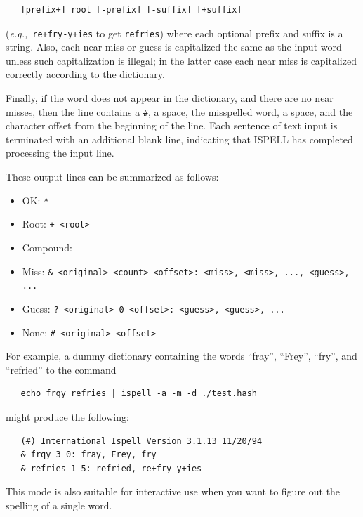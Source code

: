 \documentclass[twoside,11pt]{article}
\begin{document}
\begin{itemize}
\begin{verbatim}
   [prefix+] root [-prefix] [-suffix] [+suffix]
\end{verbatim}

({\it{e.g.,}}\ \verb=re+fry-y+ies= to get \verb+refries+) where each optional
prefix and suffix is a string.
Also, each near miss or guess is capitalized the same as the input word unless
such capitalization is illegal; in the latter case each near miss is
capitalized correctly according to the dictionary.

Finally, if the word does not appear in the dictionary, and there are no
near misses, then the line contains a \verb+#+, a space, the misspelled word, a
space, and the character offset from the beginning of the line.
Each sentence of text input is terminated with an additional blank line,
indicating that ISPELL has completed processing the input line.

These output lines can be summarized as follows:

\begin{itemize}
   \item OK:
       \verb+*+
   \item Root:
       \verb-+ <root>-
   \item Compound:
       \verb+-+
   \item Miss:
       \verb+& <original> <count> <offset>: <miss>, <miss>, ..., <guess>, ...+
   \item Guess:
       \verb+? <original> 0 <offset>: <guess>, <guess>, ...+
   \item None:
       \verb+# <original> <offset>+
\end{itemize}

For example, a dummy dictionary containing the words ``fray'', ``Frey'',
``fry'', and ``refried'' to the command

\begin{verbatim}
   echo frqy refries | ispell -a -m -d ./test.hash
\end{verbatim}

might produce the following:

\begin{verbatim}
   (#) International Ispell Version 3.1.13 11/20/94
   & frqy 3 0: fray, Frey, fry
   & refries 1 5: refried, re+fry-y+ies
\end{verbatim}

This mode is also suitable for interactive use when you want to figure out
the spelling of a single word.


\end{itemize}
\end{document}
